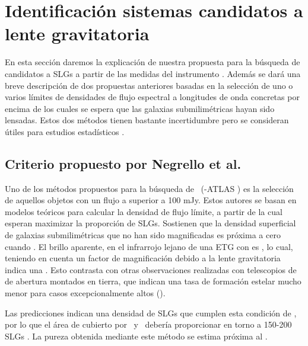 \section{Identificación sistemas candidatos a lente gravitatoria}\label{sec:5_halos}

En esta sección daremos la explicación de nuestra propuesta para la búsqueda de candidatos a SLGs a partir de las medidas del instrumento \spire. Además se dará una breve descripción de dos propuestas anteriores basadas en la selección de uno o varios límites de densidades de flujo espectral a longitudes de onda concretas por encima de los cuales se espera que las galaxias submilimétricas hayan sido lensadas. Estos dos métodos tienen bastante incertidumbre pero se consideran útiles para estudios estadísticos \citep{article:Nuevo_2012}.

\subsection{Criterio propuesto por Negrello et al.}

Uno de los métodos propuestos para la búsqueda de \halos\ (-ATLAS ) es la selección de aquellos objetos con un flujo a  superior a 100 mJy. Estos autores se basan en modelos teóricos para calcular la densidad de flujo límite, a partir de la cual esperan maximizar la proporción de SLGs. Sostienen que la densidad superficial de galaxias submilimétricas que no han sido magnificadas es próxima a cero cuando  . El brillo aparente, en el infrarrojo lejano de una ETG con  es , lo cual, teniendo en cuenta un factor de magnificación  debido a la lente gravitatoria indica una . Esto contrasta con otras observaciones realizadas con telescopios de  de abertura montados en tierra, que indican una tasa de formación estelar mucho menor para casos excepcionalmente altos ().


Las predicciones indican una densidad de SLGs que cumplen esta condición de , por lo que el área de  cubierto por \pacs\ y \spire\ debería proporcionar en torno a 150-200 SLGs  \citep{article:Nuevo_2012}. La pureza obtenida mediante este método se estima próxima al .


